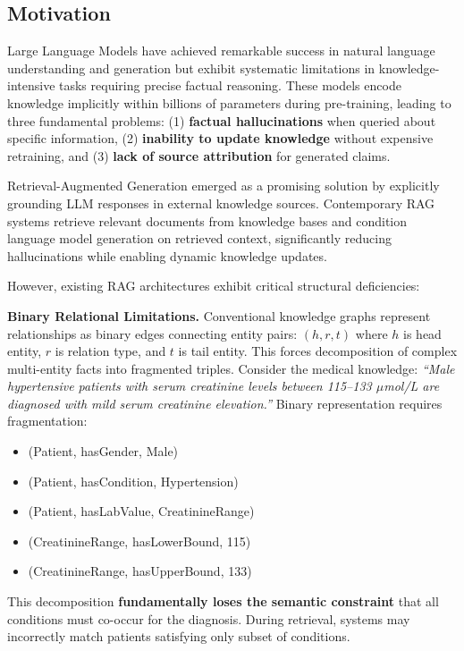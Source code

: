 \documentclass[11pt,a4paper]{article}
\begin{document}
\subsection{Motivation}

Large Language Models have achieved remarkable success in natural language understanding and generation but exhibit systematic limitations in knowledge-intensive tasks requiring precise factual reasoning. These models encode knowledge implicitly within billions of parameters during pre-training, leading to three fundamental problems: (1) \textbf{factual hallucinations} when queried about specific information, (2) \textbf{inability to update knowledge} without expensive retraining, and (3) \textbf{lack of source attribution} for generated claims.

Retrieval-Augmented Generation emerged as a promising solution by explicitly grounding LLM responses in external knowledge sources. Contemporary RAG systems retrieve relevant documents from knowledge bases and condition language model generation on retrieved context, significantly reducing hallucinations while enabling dynamic knowledge updates.

However, existing RAG architectures exhibit critical structural deficiencies:

\textbf{Binary Relational Limitations.} Conventional knowledge graphs represent relationships as binary edges connecting entity pairs: $(h, r, t)$ where $h$ is head entity, $r$ is relation type, and $t$ is tail entity. This forces decomposition of complex multi-entity facts into fragmented triples. Consider the medical knowledge: \textit{``Male hypertensive patients with serum creatinine levels between 115--133 $\mu$mol/L are diagnosed with mild serum creatinine elevation.''} Binary representation requires fragmentation:

\begin{itemize}
    \item (Patient, hasGender, Male)
    \item (Patient, hasCondition, Hypertension)
    \item (Patient, hasLabValue, CreatinineRange)
    \item (CreatinineRange, hasLowerBound, 115)
    \item (CreatinineRange, hasUpperBound, 133)
\end{itemize}

This decomposition \textbf{fundamentally loses the semantic constraint} that all conditions must co-occur for the diagnosis. During retrieval, systems may incorrectly match patients satisfying only subset of conditions.
\end{document}
